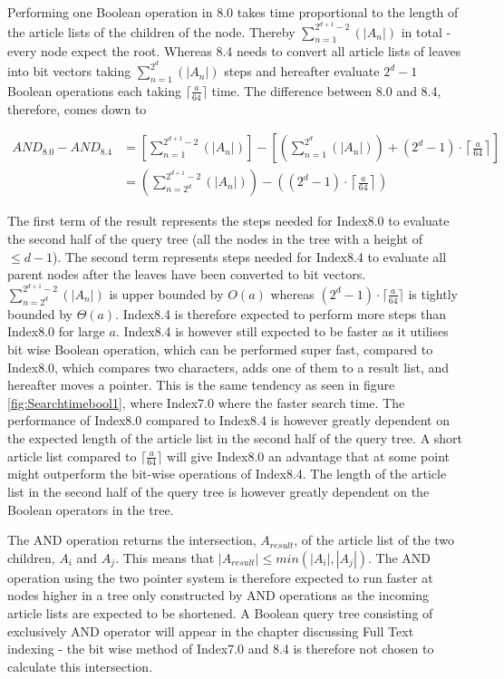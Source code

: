Performing one Boolean operation in 8.0 takes time proportional to the length of the article lists of the children of the node. Thereby $\sum_{n=1}^{2^{d+1}-2}(|A_n|)$ in total - every node expect the root. Whereas 8.4 needs to convert all article lists of leaves into bit vectors taking $\sum_{n=1}^{2^{d}}(|A_n|)$ steps and hereafter evaluate $2^d-1$ Boolean operations each taking $\lceil \frac{a}{64} \rceil$ time. The difference between 8.0 and 8.4, therefore, comes down to 

\begin{equation} \label{eq1}
\begin{split}
 AND_{8.0} - AND_{8.4} & = \left[\sum_{n=1}^{2^{d+1}-2}(|A_n|)\right] - \left[\left(\sum_{n=1}^{2^{d}}(|A_n|)\right) + (2^{d}-1) \cdot \left\lceil \frac{a}{64} \right\rceil\right] \\
 & = \left(\sum_{n=2^d}^{2^{d+1}-2}(|A_n|)\right) - \left((2^{d}-1) \cdot \left\lceil \frac{a}{64} \right\rceil\right)
\end{split}
\end{equation}

The first term of the result represents the steps needed for Index8.0 to evaluate the second half of the query tree (all the nodes in the tree with a height of $\leq d-1$). The second term represents steps needed for Index8.4 to evaluate all parent nodes after the leaves have been converted to bit vectors.
$\sum_{n=2^d}^{2^{d+1}-2}(|A_n|)$ is upper bounded by $O(a)$ whereas $(2^{d}-1) \cdot \lceil \frac{a}{64} \rceil$ is tightly bounded by $\Theta(a)$. Index8.4 is therefore expected to perform more steps than Index8.0 for large $a$. Index8.4 is however still expected to be faster as it utilises bit wise Boolean operation, which can be performed super fast, compared to Index8.0, which compares two characters, adds one of them to a result list, and hereafter moves a pointer. This is the same tendency as seen in figure \ref{fig:Searchtimebool1}, where Index7.0 where the faster search time. The performance of Index8.0 compared to Index8.4 is however greatly dependent on the expected length of the article list in the second half of the query tree. A short article list compared to $\lceil \frac{a}{64} \rceil$ will give Index8.0 an advantage that at some point might outperform the bit-wise operations of Index8.4. The length of the article list in the second half of the query tree is however greatly dependent on the Boolean operators in the tree. 

The AND operation returns the intersection, $A_{result}$, of the article list of the two children, $A_i$ and $A_j$. This means that $|A_{result}|\leq min(|A_i|,|A_j|)$. The AND operation using the two pointer system is therefore expected to run faster at nodes higher in a tree only constructed by AND operations as the incoming article lists are expected to be shortened. A Boolean query tree consisting of exclusively AND operator will appear in the chapter discussing Full Text indexing - the bit wise method of Index7.0 and 8.4 is therefore not chosen to calculate this intersection.

